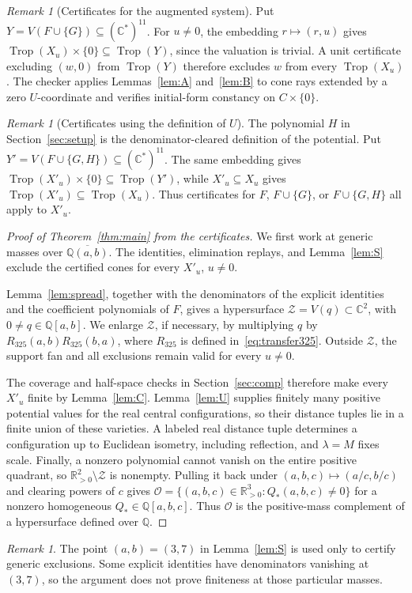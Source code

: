 \documentclass[11pt]{amsart}
\theoremstyle{definition}\newtheorem{definition}[theorem]{Definition}\theoremstyle{remark}\newtheorem{remark}[theorem]{Remark}
\newcommand{\Trop}{\operatorname{Trop}}\newcommand{\inn}{\operatorname{in}}\newcommand{\Q}{\mathbb{Q}}
\begin{document}
\begin{remark}[Certificates for the augmented system]\label{rem:FG}
Put $Y=V(F\cup\{G\})\subseteq(\mathbb{C}^*)^{11}$. For $u\neq0$, the embedding $r\mapsto(r,u)$ gives $\Trop(X_u)\times\{0\}\subseteq\Trop(Y)$, since the valuation is trivial. A unit certificate excluding $(w,0)$ from $\Trop(Y)$ therefore excludes $w$ from every $\Trop(X_u)$. The checker applies Lemmas~\ref{lem:A} and~\ref{lem:B} to cone rays extended by a zero $U$-coordinate and verifies initial-form constancy on $C\times\{0\}$.
\end{remark}

\begin{remark}[Certificates using the definition of $U$]\label{rem:FGH}
The polynomial $H$ in Section~\ref{sec:setup} is the denominator-cleared definition of the potential. Put $Y'=V(F\cup\{G,H\})\subseteq(\mathbb{C}^*)^{11}$. The same embedding gives $\Trop(X'_u)\times\{0\}\subseteq\Trop(Y')$, while $X'_u\subseteq X_u$ gives $\Trop(X'_u)\subseteq\Trop(X_u)$. Thus certificates for $F$, $F\cup\{G\}$, or $F\cup\{G,H\}$ all apply to $X'_u$.
\end{remark}

\begin{proof}[Proof of Theorem~\ref{thm:main} from the certificates]
We first work at generic masses over $\overline{\Q(a,b)}$. The identities, elimination replays, and Lemma~\ref{lem:S} exclude the certified cones for every $X'_u$, $u\ne0$.

Lemma~\ref{lem:spread}, together with the denominators of the explicit identities and the coefficient polynomials of $F$, gives a hypersurface $\mathcal Z=V(q)\subset\mathbb C^2$, with $0\ne q\in\Q[a,b]$. We enlarge $\mathcal Z$, if necessary, by multiplying $q$ by $R_{325}(a,b)R_{325}(b,a)$, where $R_{325}$ is defined in~\eqref{eq:transfer325}. Outside $\mathcal Z$, the support fan and all exclusions remain valid for every $u\ne0$.

The coverage and half-space checks in Section~\ref{sec:comp} therefore make every $X'_u$ finite by Lemma~\ref{lem:C}. Lemma~\ref{lem:U} supplies finitely many positive potential values for the real central configurations, so their distance tuples lie in a finite union of these varieties. A labeled real distance tuple determines a configuration up to Euclidean isometry, including reflection, and $\lambda=M$ fixes scale. Finally, a nonzero polynomial cannot vanish on the entire positive quadrant, so $\mathbb R_{>0}^2\setminus\mathcal Z$ is nonempty. Pulling it back under $(a,b,c)\mapsto(a/c,b/c)$ and clearing powers of $c$ gives $\mathcal O=\{(a,b,c)\in\mathbb R_{>0}^3:Q_*(a,b,c)\ne0\}$ for a nonzero homogeneous $Q_*\in\Q[a,b,c]$. Thus $\mathcal O$ is the positive-mass complement of a hypersurface defined over $\Q$.

\end{proof}
\begin{remark}
The point $(a,b)=(3,7)$ in Lemma~\ref{lem:S} is used only to certify generic exclusions. Some explicit identities have denominators vanishing at $(3,7)$, so the argument does not prove finiteness at those particular masses.
\end{remark}
\end{document}

